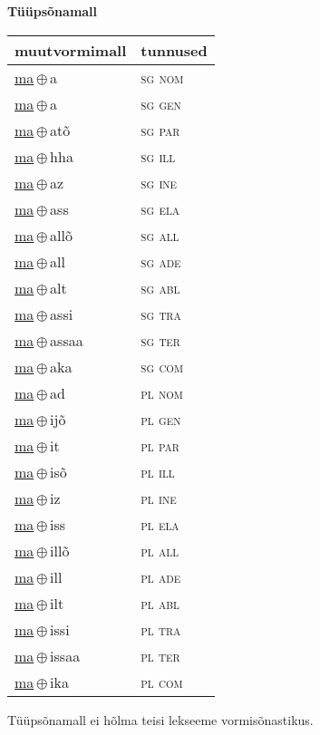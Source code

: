 

\vspace{3.5em}
\noindent \begin{minipage}{\textwidth}
\noindent \textbf{Tüüpsõnamall \,}\\

\begin{sideways}
\begin{tabular}{l l}
muutvormimall & tunnused \\
\hline
\underline{ma}\,$\oplus$\,a & \textsc{ sg nom } \\
\underline{ma}\,$\oplus$\,a & \textsc{ sg gen } \\
\underline{ma}\,$\oplus$\,atõ & \textsc{ sg par } \\
\underline{ma}\,$\oplus$\,hha & \textsc{ sg ill } \\
\underline{ma}\,$\oplus$\,az & \textsc{ sg ine } \\
\underline{ma}\,$\oplus$\,ass & \textsc{ sg ela } \\
\underline{ma}\,$\oplus$\,allõ & \textsc{ sg all } \\
\underline{ma}\,$\oplus$\,all & \textsc{ sg ade } \\
\underline{ma}\,$\oplus$\,alt & \textsc{ sg abl } \\
\underline{ma}\,$\oplus$\,assi & \textsc{ sg tra } \\
\underline{ma}\,$\oplus$\,assaa & \textsc{ sg ter } \\
\underline{ma}\,$\oplus$\,aka & \textsc{ sg com } \\
\underline{ma}\,$\oplus$\,ad & \textsc{ pl nom } \\
\underline{ma}\,$\oplus$\,ijõ & \textsc{ pl gen } \\
\underline{ma}\,$\oplus$\,it & \textsc{ pl par } \\
\underline{ma}\,$\oplus$\,isõ & \textsc{ pl ill } \\
\underline{ma}\,$\oplus$\,iz & \textsc{ pl ine } \\
\underline{ma}\,$\oplus$\,iss & \textsc{ pl ela } \\
\underline{ma}\,$\oplus$\,illõ & \textsc{ pl all } \\
\underline{ma}\,$\oplus$\,ill & \textsc{ pl ade } \\
\underline{ma}\,$\oplus$\,ilt & \textsc{ pl abl } \\
\underline{ma}\,$\oplus$\,issi & \textsc{ pl tra } \\
\underline{ma}\,$\oplus$\,issaa & \textsc{ pl ter } \\
\underline{ma}\,$\oplus$\,ika & \textsc{ pl com } \\
\end{tabular}
\end{sideways}
\label{tab:tüüpsõnamall-maa}

\end{minipage}

 
\vspace{1em}
\noindent Tüüpsõnamall  ei hõlma teisi lekseeme vormi\-sõnastikus.
